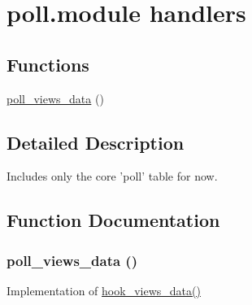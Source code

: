 \hypertarget{group__views__poll__module}{
\section{poll.module handlers}
\label{group__views__poll__module}
}
\subsection*{Functions}
\begin{CompactItemize}
\item 
\hyperlink{group__views__poll__module_g02ad941a7e05ae1fe142ac35ad3ccb19}{poll\_\-views\_\-data} ()
\end{CompactItemize}


\subsection{Detailed Description}
Includes only the core 'poll' table for now. 

\subsection{Function Documentation}
\hypertarget{group__views__poll__module_g02ad941a7e05ae1fe142ac35ad3ccb19}{
\subsubsection[{poll\_\-views\_\-data}]{\setlength{\rightskip}{0pt plus 5cm}poll\_\-views\_\-data ()}}
\label{group__views__poll__module_g02ad941a7e05ae1fe142ac35ad3ccb19}


Implementation of \hyperlink{group__views__hooks_g227057901681e4a33e33c199c7a8c989}{hook\_\-views\_\-data()} 